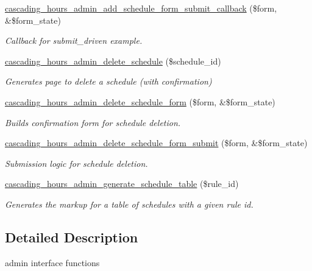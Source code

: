\begin{DoxyCompactItemize}
\hyperlink{cascading__hours_8admin_8php_aa59e787ac3091e4c611471f8fc83b196_aa59e787ac3091e4c611471f8fc83b196}{cascading\+\_\+hours\+\_\+admin\+\_\+add\+\_\+schedule\+\_\+form\+\_\+submit\+\_\+callback} (\$form, \&\$form\+\_\+state)
\begin{DoxyCompactList}\small\item\em Callback for submit\+\_\+driven example. \end{DoxyCompactList}\item 
\hyperlink{cascading__hours_8admin_8php_a57b852e3ac3da923d48c0e65cffce2df_a57b852e3ac3da923d48c0e65cffce2df}{cascading\+\_\+hours\+\_\+admin\+\_\+delete\+\_\+schedule} (\$schedule\+\_\+id)
\begin{DoxyCompactList}\small\item\em Generates page to delete a schedule (with confirmation) \end{DoxyCompactList}\item 
\hyperlink{cascading__hours_8admin_8php_a883a2af8b6434faccc0ff58acc372d5a_a883a2af8b6434faccc0ff58acc372d5a}{cascading\+\_\+hours\+\_\+admin\+\_\+delete\+\_\+schedule\+\_\+form} (\$form, \&\$form\+\_\+state)
\begin{DoxyCompactList}\small\item\em Builds confirmation form for schedule deletion. \end{DoxyCompactList}\item 
\hyperlink{cascading__hours_8admin_8php_a4d1dc1a37c49d7cedb74aa92ecf04a74_a4d1dc1a37c49d7cedb74aa92ecf04a74}{cascading\+\_\+hours\+\_\+admin\+\_\+delete\+\_\+schedule\+\_\+form\+\_\+submit} (\$form, \&\$form\+\_\+state)
\begin{DoxyCompactList}\small\item\em Submission logic for schedule deletion. \end{DoxyCompactList}\item 
\hyperlink{cascading__hours_8admin_8php_a997aa68f4607a3ef09a3dee86881633f_a997aa68f4607a3ef09a3dee86881633f}{cascading\+\_\+hours\+\_\+admin\+\_\+generate\+\_\+schedule\+\_\+table} (\$rule\+\_\+id)
\begin{DoxyCompactList}\small\item\em Generates the markup for a table of schedules with a given rule id. \end{DoxyCompactList}\end{DoxyCompactItemize}


\subsection{Detailed Description}
admin interface functions 



